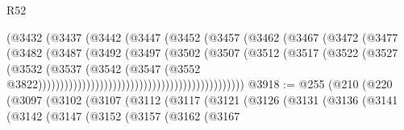 \begin{lexlean}{R52}
\begin{coremodule}
{{{{{{{{{{{{{{{{{{{{{{{{{{{{{{{{{{{{{{{{{{{{{{{{{{{{{{{{{{{{{{{{{{{{{{{{{{{{{{{{{{{{{{{{{{{{{{{{{{{{{{{{{{{{{{{{{{{{{{{{{{{{{{{{{{{{{{{{{{{{{{{{{{{{{{{{{{{{{{{{{{{{{{{{{{{{{{{{{{{{{{{{{{{{{{{{{{{{{{                                                (@3432
                                                  (@3437
                                                    (@3442
                                                      (@3447
                                                        (@3452
                                                          (@3457
                                                            (@3462
                                                              (@3467
                                                                (@3472
                                                                  (@3477
                                                                    (@3482
                                                                      (@3487
                                                                        (@3492
                                                                          (@3497
                                                                            (@3502
                                                                              (@3507
                                                                                (@3512
                                                                                  (@3517
                                                                                    (@3522
                                                                                      (@3527
                                                                                        (@3532
                                                                                          (@3537
                                                                                            (@3542
                                                                                              (@3547
                                                                                                (@3552
                                                                                                  @3822)))))))))))))))))))))))))))))))))))))))))))))))
@3918 := @255
    (@210
      (@220
        (@3097
          (@3102
            (@3107
              (@3112
                (@3117
                  (@3121
                    (@3126
                      (@3131
                        (@3136
                          (@3141
                            (@3142
                              (@3147
                                (@3152
                                  (@3157
                                    (@3162
                                      (@3167
}}}}}}}}}}}}}}}}}}}}}}}}}}}}}}}}}}}}}}}}}}}}}}}}}}}}}}}}}}}}}}}}}}}}}}}}}}}}}}}}}}}}}}}}}}}}}}}}}}}}}}}}}}}}}}}}}}}}}}}}}}}}}}}}}}}}}}}}}}}}}}}}}}}}}}}}}}}}}}}}}}}}}}}}}}}}}}}}}}}}}}}}}}}}}}}}}}}}}}
\end{coremodule}
\end{lexlean}
